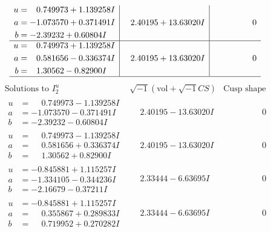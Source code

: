\documentclass[1p]{elsarticle_modified}
\theoremstyle{definition}
\newcommand{\I}{\sqrt{-1}}
\begin{document}
$$\begin{array}{c|c|c}
\begin{aligned}
u &= \phantom{-}0.749973 + 1.139258 I \\
a &= -1.073570 + 0.371491 I \\
b &= -2.39232 + 0.60804 I\end{aligned}
 & \phantom{-}2.40195 + 13.63020 I & \phantom{-0.000000 } 0 \\ \hline\begin{aligned}
u &= \phantom{-}0.749973 + 1.139258 I \\
a &= \phantom{-}0.581656 - 0.336374 I \\
b &= \phantom{-}1.30562 - 0.82900 I\end{aligned}
 & \phantom{-}2.40195 + 13.63020 I & \phantom{-0.000000 } 0\\
 \hline 
 \end{array}$$\newpage$$\begin{array}{c|c|c}  
\text{Solutions to }I^u_{2}& \I (\text{vol} + \sqrt{-1}CS) & \text{Cusp shape}\\
 \hline 
\begin{aligned}
u &= \phantom{-}0.749973 - 1.139258 I \\
a &= -1.073570 - 0.371491 I \\
b &= -2.39232 - 0.60804 I\end{aligned}
 & \phantom{-}2.40195 - 13.63020 I & \phantom{-0.000000 } 0 \\ \hline\begin{aligned}
u &= \phantom{-}0.749973 - 1.139258 I \\
a &= \phantom{-}0.581656 + 0.336374 I \\
b &= \phantom{-}1.30562 + 0.82900 I\end{aligned}
 & \phantom{-}2.40195 - 13.63020 I & \phantom{-0.000000 } 0 \\ \hline\begin{aligned}
u &= -0.845881 + 1.115257 I \\
a &= -1.334105 - 0.344236 I \\
b &= -2.16679 - 0.37211 I\end{aligned}
 & \phantom{-}2.33444 - 6.63695 I & \phantom{-0.000000 } 0 \\ \hline\begin{aligned}
u &= -0.845881 + 1.115257 I \\
a &= \phantom{-}0.355867 + 0.289833 I \\
b &= \phantom{-}0.719952 + 0.270282 I\end{aligned}
 & \phantom{-}2.33444 - 6.63695 I & \phantom{-0.000000 } 0 \\ \hline\begin{aligned}

\end{aligned}
\end{array}$$
\end{document}
